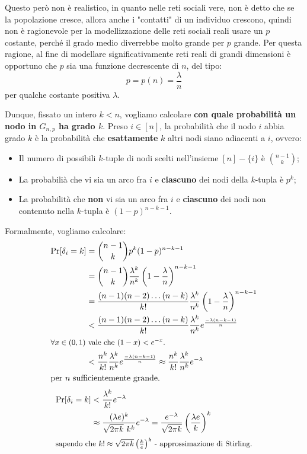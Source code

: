 Questo però non è realistico, in quanto nelle reti sociali vere, non è detto che se la popolazione cresce, allora anche i "contatti" di un individuo crescono, quindi non è ragionevole per la modellizzazione delle reti sociali reali usare un $p$ costante, perché il grado medio diverrebbe molto grande per $p$ grande.
Per questa ragione, al fine di modellare significativamente reti reali di grandi
dimensioni è opportuno che $p$ sia una funzione decrescente di $n$, del tipo:
\[
p = p(n) = \frac{\lambda}{n}
\]
per qualche costante positiva $\lambda$.

\newpage

Dunque, fissato un intero $k < n$, vogliamo calcolare \textbf{con quale probabilità un nodo in $G_{n,p}$ ha grado $k$}.
Preso $i \in [n]$, la probabilità che il nodo $i$ abbia grado $k$ è la probabilità che \textbf{esattamente} $k$ altri nodi siano adiacenti a $i$, ovvero:
\begin{itemize}
    \item Il numero di possibili $k$-tuple di nodi scelti nell'insieme $[n] - \{i\} \text{ è } \binom{n-1}{k}$;
    \item La probabilià che vi sia un arco fra $i$ e \textbf{ciascuno} dei nodi della $k$-tupla è $p^k$;
    \item La probabilità che \textbf{non} vi sia un arco fra $i$ e \textbf{ciascuno} dei nodi non contenuto nella $k$-tupla è $(1-p)^{n-k-1}$.
\end{itemize}
Formalmente, vogliamo calcolare:
\begin{align*}
    \Pr[\delta_i = k] &= \binom{n - 1}{k}p^k(1-p)^{n-k-1} \\
    &= \binom{n - 1}{k}\frac{\lambda^k}{n^k}\left(1-\frac{\lambda}{n}\right)^{n-k-1} \\
    &= \frac{(n-1)(n-2)\dots(n-k)}{k!}\frac{\lambda^k}{n^k}\left(1-\frac{\lambda}{n}\right)^{n-k-1} \\
    &< \frac{(n-1)(n-2)\dots(n-k)}{k!}\frac{\lambda^k}{n^k} e^{\frac{-\lambda(n-k-1)}{n}} \\
    \intertext{\small $\forall x \in (0,1)$ vale che $(1-x) < e^{-x}$.}
    &< \frac{n^k}{k!}\frac{\lambda^k}{n^k} e^{\frac{-\lambda(n-k-1)}{n}} \approx \frac{n^k}{k!}\frac{\lambda^k}{n^k} e^{-\lambda} \\
    \intertext{per $n$ sufficientemente grande.}
\end{align*}
\begin{align*}
    \Pr[\delta_i = k] &< \frac{\lambda^k}{k!} e^{-\lambda} \\
    &\approx \frac{(\lambda e)^k}{\sqrt{2\pi k}\ k^k} e^{-\lambda} = \frac{e^{-\lambda}}{\sqrt{2\pi k}} \left(\frac{\lambda e}{k}\right)^k \\
    \intertext{\small sapendo che $k! \approx \sqrt{2\pi k}\left(\frac{k}{e}\right)^k$ - approssimazione di Stirling.}
\end{align*}

